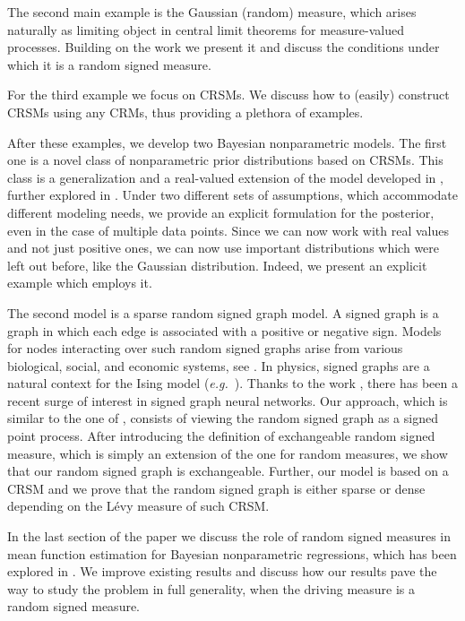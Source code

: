 \documentclass{article}
\theoremstyle{plain}
\theoremstyle{remark}
\begin{document}
The second main example is the Gaussian (random) measure, which arises naturally as limiting object in central limit theorems for measure-valued processes. Building on the work \citet{Horo-Gauss} we present it and discuss the conditions under which it is a random signed measure. 

For the third example we focus on CRSMs. We discuss how to (easily) construct CRSMs using any CRMs, thus providing a plethora of examples.

After these examples, we develop two Bayesian nonparametric models. The first one is a novel class of nonparametric prior distributions based on CRSMs. This class is a generalization and a real-valued extension of the model developed in \citet{Bro1}, further explored in \citet{Bro2,PassRM}. Under two different sets of assumptions, which accommodate different modeling needs, we provide an explicit formulation for the posterior, even in the case of multiple data points. Since we can now work with real values and not just positive ones, we can now use important distributions which were left out before, like the Gaussian distribution. Indeed, we present an explicit example which employs it.


The second model is a sparse random signed graph model. A signed graph is a graph in which each edge is associated with a positive or negative sign. Models for nodes interacting over such random signed graphs arise from various biological, social, and economic systems, see \citet{Siam}. In physics, signed graphs are a natural context for the Ising model (\textit{e.g.}~\citet{Ising}). Thanks to the work \citet{Derr}, there has been a recent surge of interest in signed graph neural networks. Our approach, which is similar to the one of \citet{Caron-and-Fox}, consists of viewing the random signed graph as a signed point process. After introducing the definition of exchangeable random signed measure, which is simply an extension of the one for random measures, we show that our random signed graph is exchangeable. Further, our model is based on a CRSM and we prove that the random signed graph is either sparse or dense depending on the L\'{e}vy measure of such CRSM.

In the last section of the paper we discuss the role of random signed measures in mean function estimation for Bayesian nonparametric regressions, which has been explored in \citet{DeBlasiPeccatiPrunster,GhosalVanDerVaart2007,IshwaranJames,LijoiNipoti,LoWeng1989,Naulet,PeccatiPrunster09,Wolpert}. We improve existing results and discuss how our results pave the way to study the problem in full generality, when the driving measure is a random signed measure.
\end{document}

